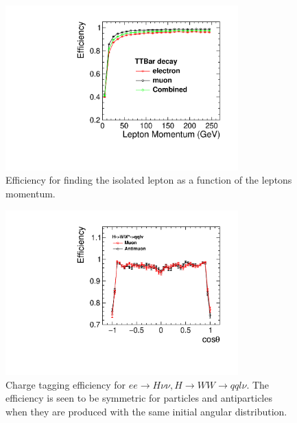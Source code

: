 \begin{figure}
  \centering
  \includegraphics[width=0.8\textwidth]{TopAnalysis/figures/LeptonEfficiencysVsE.pdf}
  \caption[Lepton Efficiency Vs Momentum]{Efficiency for finding the isolated lepton as a function of the leptons momentum.}
  \label{fig:leptonefficiencyVsE}
\end{figure}

\begin{figure}
  \centering
  \includegraphics[width=0.8\textwidth]{TopAnalysis/figures/MuonEfficiency_Higgs.pdf}
  \caption[Lepton efficiency for $ee\rightarrow H\nu\nu,H \rightarrow WW\rightarrow qql\nu$ ]{Charge tagging efficiency for $ee\rightarrow H\nu\nu,H \rightarrow WW\rightarrow qql\nu$. The efficiency is seen to be symmetric for particles and antiparticles when they are produced with the same initial angular distribution.}
  \label{fig:higgsleptons}
\end{figure}

